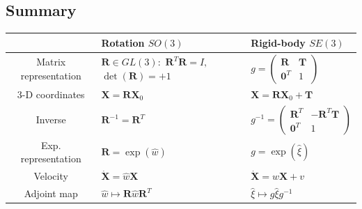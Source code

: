 \documentclass[oneside,fontsize=11pt,paper=a4]{scrartcl}
\begin{document}
\subsection*{Summary}%
\renewcommand{\arraystretch}{1.3}%
\begin{tabularx}{\linewidth}{|c|Y|Y|}
    \hline
     & Rotation $SO(3)$ & Rigid-body $SE(3)$ \\ \hline
     Matrix representation &  & $g = \begin{pmatrix}\mathbf{R} & \mathbf{T}\\\mathbf{0}^T & 1 \end{pmatrix}$ \\ -D coordinates & $\mathbf{X} = \mathbf{R}\mathbf{X}_0$ & $\mathbf{X} = \mathbf{R}\mathbf{X}_0 + \mathbf{T}$ \\ \hline
     Inverse & $\mathbf{R}^{-1} = \mathbf{R}^T$ & $g^{-1} = \begin{pmatrix}\mathbf{R}^T & -\mathbf{R}^T\mathbf{T}\\\mathbf{0}^T & 1 \end{pmatrix}$ \\ \hline
     Exp. representation & $\mathbf{R} = \exp(\hat{w})$ & $g = \exp(\hat{\xi})$ \\ \hline
     Velocity & $\mathbf{\dot{X}} = \hat{w}\mathbf{X}$ & $\mathbf{\dot{X}} = \hat{w}\mathbf{X} + v$ \\ \hline
     Adjoint map & $\hat{w} \mapsto \mathbf{R} \hat{w} \mathbf{R}^T$ & $\hat{\xi} \mapsto g \hat{\xi} g^{-1}$ \\ \hline
\end{tabularx}
\renewcommand{\arraystretch}{1.0}%
\vspace{5mm}
\end{document}
